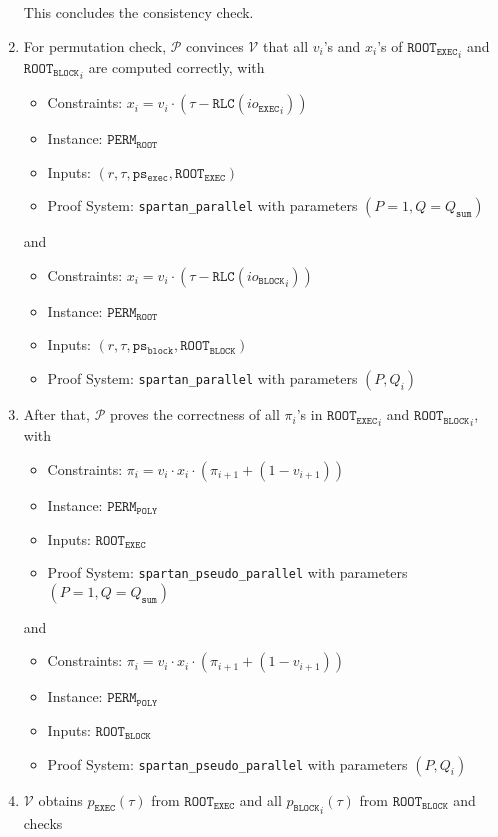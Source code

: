 \documentclass{article}
\newcommand{\code}{\texttt}
\newcommand{\Qsum}{Q_{\mathtt{sum}}}
\renewcommand{\P}{\mathcal{P}}
\newcommand{\V}{\mathcal{V}}
\newcommand{\RLC}{\mathtt{RLC}}
\newcommand{\iob}{io_{\mathtt{BLOCK}}}
\newcommand{\ioe}{io_{\mathtt{EXEC}}}
\newcommand{\ROOTE}{\mathtt{ROOT_{EXEC}}}
\newcommand{\ROOTB}{\mathtt{ROOT_{BLOCK}}}
\newcommand{\psb}{\mathtt{ps_{block}}}
\newcommand{\pse}{\mathtt{ps_{exec}}}
\begin{document}
\begin{enumerate}
    This concludes the consistency check.
    \item For permutation check, $\P$ convinces $\V$ that all $v_i$'s and $x_i$'s of ${\ROOTE}_i$ and ${\ROOTB}_i$ are computed correctly, with
    \begin{itemize}
        \item Constraints: $x_i = v_i \cdot (\tau - \RLC({\ioe}_i))$
        \item Instance: $\mathtt{PERM}_\mathtt{ROOT}$
        \item Inputs: $(r, \tau, \pse, \ROOTE)$
        \item Proof System: \code{spartan\_parallel} with parameters $(P = 1, Q = \Qsum)$
    \end{itemize}
    and
    \begin{itemize}
        \item Constraints: $x_i = v_i \cdot (\tau - \RLC({\iob}_i))$
        \item Instance: $\mathtt{PERM}_\mathtt{ROOT}$
        \item Inputs: $(r, \tau, \psb, \ROOTB)$
        \item Proof System: \code{spartan\_parallel} with parameters $(P, Q_i)$
    \end{itemize}
    \item After that, $\P$ proves the correctness of all $\pi_i$'s in ${\ROOTE}_i$ and ${\ROOTB}_i$, with
    \begin{itemize}
        \item Constraints: $\pi_i = v_i \cdot x_i \cdot (\pi_{i+1} + (1 - v_{i+1}))$
        \item Instance: $\mathtt{PERM}_\mathtt{POLY}$
        \item Inputs: $\ROOTE$
        \item Proof System: \code{spartan\_pseudo\_parallel} with parameters $(P = 1, Q = \Qsum)$
    \end{itemize}
    and
    \begin{itemize}
        \item Constraints: $\pi_i = v_i \cdot x_i \cdot (\pi_{i+1} + (1 - v_{i+1}))$
        \item Instance: $\mathtt{PERM}_\mathtt{POLY}$
        \item Inputs: $\ROOTB$
        \item Proof System: \code{spartan\_pseudo\_parallel} with parameters $(P, Q_i)$
    \end{itemize}
    \item $\V$ obtains $p_\mathtt{EXEC}(\tau)$ from $\ROOTE$ and all ${p_\mathtt{BLOCK}}_i(\tau)$ from $\ROOTB$ and checks 

\end{enumerate}
\end{document}

